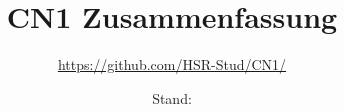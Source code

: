 


\subject{Computernetzwerke 1}
\title{CN1 Zusammenfassung}
\author{\url{https://github.com/HSR-Stud/CN1/}}
\date{Stand: \revisiondate}






\setcounter{section}{-1}















